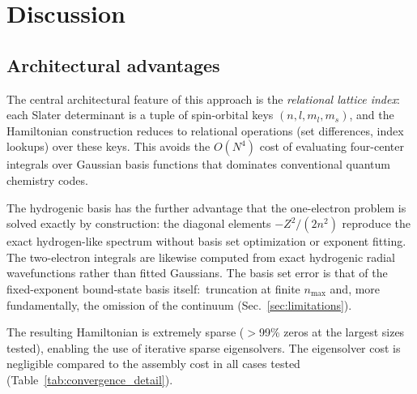 \documentclass[aps,pra,twocolumn,superscriptaddress,longbibliography,floatfix]{revtex4-2}
\begin{document}
\section{Discussion}
\label{sec:discussion}

\subsection{Architectural advantages}
\label{sec:advantages}

The central architectural feature of this approach is the
\emph{relational lattice index}: each Slater determinant is a tuple
of spin-orbital keys $(n, l, m_l, m_s)$, and the Hamiltonian
construction reduces to relational operations (set differences,
index lookups) over these keys.
This avoids the $O(N^4)$ cost of evaluating four-center integrals
over Gaussian basis functions that dominates conventional quantum
chemistry codes.

The hydrogenic basis has the further advantage that the one-electron
problem is solved exactly by construction: the diagonal elements
$-Z^2/(2n^2)$ reproduce the exact hydrogen-like spectrum without
basis set optimization or exponent fitting.
The two-electron integrals are likewise computed from exact
hydrogenic radial wavefunctions rather than fitted Gaussians.
The basis set error is that of the fixed-exponent bound-state basis
itself:\ truncation at finite $n_{\max}$ and, more fundamentally, the
omission of the continuum (Sec.~\ref{sec:limitations}).

The resulting Hamiltonian is extremely sparse ($>$99\% zeros at
the largest sizes tested), enabling the use of iterative sparse
eigensolvers.
The eigensolver cost is negligible compared to the assembly cost
in all cases tested (Table~\ref{tab:convergence_detail}).
\end{document}
